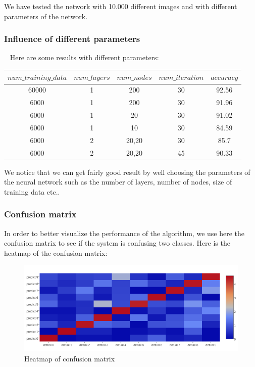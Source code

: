 \documentclass[paper=a4, french, 11pt]{scrartcl}
\begin{document}
We have tested the network with 10.000 different images and with different parameters of the network.

\subsubsection{Influence of different parameters}
~\indent
Here are some results with different parameters:

\begin{small}
	\begin{tabular}{ |c|c|c|c|c| }
	\hline
	$num\_training\_data$ & $num\_layers$ & $num\_nodes$ & $num\_iteration$ & $accuracy$ \\
	\hline
	60000 & 1 & 200  & 30 & 92.56 \\
	\hline
	6000 & 1 & 200  & 30 & 91.96 \\
	\hline
	6000 & 1 & 20  & 30 & 91.02 \\
	\hline
	6000	 & 1 & 10  & 30 & 84.59 \\
	\hline
	6000 & 2 & 20,20  & 30 & 85.7\\
	\hline
	6000 & 2 & 20,20  & 45 & 90.33\\
	\hline
	\end{tabular}
\end{small}

We notice that we can get fairly good result by well choosing the parameters of the neural network such as the number of layers, number of nodes, size of training data etc.. 

\subsubsection{Confusion matrix}
In order to better visualize the performance of the algorithm, we use here the confusion matrix to see if the system is confusing two classes. Here is the heatmap of the confusion matrix:

\begin{figure}[h]
\vspace{-1ex}
\begin{center}
   \includegraphics[width=1.0\linewidth]{heatmap_log.png}
\end{center}
\vspace{-3ex}
\caption{Heatmap of confusion matrix}
\label{fig:heatmap}
\end{figure}
\end{document}
